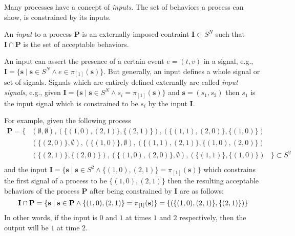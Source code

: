 Many processes have a concept of \emph{inputs}. The set of behaviors
a process can show, is constrained by its inputs.
\begin{definition}\label{tsm-input}
An \emph{input} to a process $\mathbf{P}$ is an externally
imposed contraint $\mathbf{I} \subset S^N$ such that
$\mathbf{I} \cap \mathbf{P}$ is the set of acceptable behaviors.
\end{definition}
An input can assert the presence of a certain event $e = (t,v)$ in a signal,
e.g., $\mathbf{I} = \{\mathbf{s} \mid \mathbf{s} \in S^N \wedge e \in \pi{}_{[1]}(\mathbf{s}) \}$.
But generally, an input defines a whole signal or set of signals.
Signals which are entirely defined externally are called \emph{input signals},
e.g., given $\mathbf{I} = \{\mathbf{s} \mid \mathbf{s} \in S^N \wedge s_i = \pi{}_{[1]}(\mathbf{s})\}$ and
$\mathbf{s} = (s_1, s_2)$ then $s_1$ is the input signal which
is constrained to be $s_i$ by the input $\mathbf{I}$.


\begin{example}
For example, given the following process
\label{ex:example-with-process-1}
\begin{displaymath}
\begin{array}{rll}
  \mathbf{P} = \{ & (\emptyset,\emptyset), (\{(1,0),(2,1)\},\{(2,1)\}), (\{(1,1),(2,0)\},\{(1,0)\})&\\
                  & (\{(2,0)\},\emptyset), (\{(1,0)\},\emptyset), (\{(1,1),(2,1)\},\{(1,0),(2,0)\})&\\
                  & (\{(2,1)\},\{(2,0)\}), (\{(1,0),(2,0)\},\emptyset), (\{(1,1)\},\{(1,0)\}) &\} \subset S^2\\
\end{array}
\end{displaymath}
and the input $\mathbf{I} = \{\mathbf{s} \mid  \mathbf{s} \in S^2 \wedge \{(1,0),(2,1)\} = \pi{}_{[1]}(\mathbf{s})\}$
which constrains the first signal of a process to be $\{(1,0),(2,1)\}$ then
the resulting acceptable behaviors of the process $\mathbf{P}$ after being
constrained by $\mathbf{I}$ are as follows:
\begin{displaymath}
  \mathbf{I} \cap \mathbf{P} = \{\mathbf{s} \mid \mathbf{s} \in \mathbf{P} \wedge \{(1,0),(2,1)\} = \pi{}_{[1]}(\mathbf{s})\} =
                               \{(\{(1,0),(2,1)\},\{(2,1)\})\}\\
\end{displaymath}
In other words, if the input is $0$ and $1$ at times $1$ and $2$ respectively,
then the output will be $1$ at time $2$.
\end{example}

